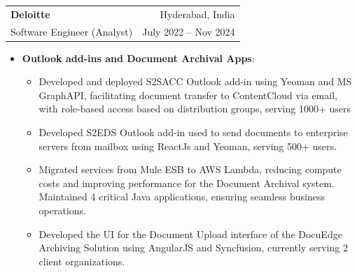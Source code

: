 \documentclass[letterpaper,10pt]{article}
\makeatletter
\newcommand{\resumeItems}[2]{
  \item\small{
    \textbf{#1}{:} 
  \begin{itemize}[label=\textbullet, left=2pt, itemsep=1pt]
      #2
    \end{itemize}
    }
}
\newcommand{\resumeSubheading}[4]{
  \item
    \begin{tabular*}{0.97\textwidth}{l@{\extracolsep{\fill}}r}
      \textbf{#1} & {\small #2} \\
      {\small#3} & {\small #4} \\
    \end{tabular*}\vspace{-4pt}
}
\newcommand{\resumeItemListStart}{\begin{itemize}[left=3pt]}
\newcommand{\resumeItemListEnd}{\end{itemize}\vspace{-5pt}}
\makeatother
\begin{document}
    \resumeSubheading
        {Deloitte}{Hyderabad, India}
        {Software Engineer (Analyst)}{July 2022 -- Nov 2024}
        \resumeItemListStart
            \resumeItems{Outlook add-ins and Document Archival Apps}
            {
                \item Developed and deployed S2SACC Outlook add-in using Yeoman and MS GraphAPI, facilitating document transfer to ContentCloud via email, with role-based access based on distribution groups, serving 1000+ users
                
                \item Developed S2EDS Outlook add-in used to send documents to enterprise servers from mailbox using ReactJs and Yeoman, serving 500+ users.

                \item Migrated services from Mule ESB to AWS Lambda, reducing compute costs and improving performance for the Document Archival system. Maintained 4 critical Java applications, ensuring seamless business operations.
                
                \item Developed the UI for the Document Upload interface of the DocuEdge Archiving Solution using AngularJS and Syncfusion, currently serving 2 client organizations.  
            }
        \resumeItemListEnd
        
\end{document}
